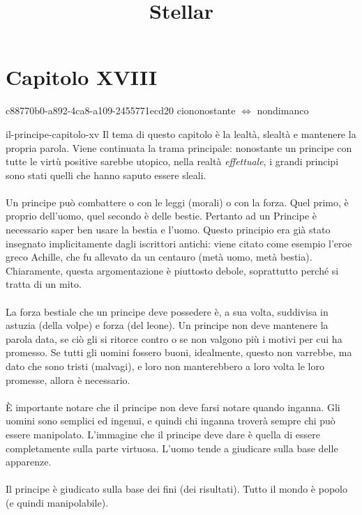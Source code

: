 \documentclass[preview]{standalone}
\begin{document}
\title{Stellar}
\genpage

\section{Capitolo XVIII}

\begin{snippetnote}{c88770b0-a892-4ca8-a109-2455771ecd20}{}
    ciononostante \(\iff\) nondimanco
\end{snippetnote}

\begin{snippet}{il-principe-capitolo-xv}
    Il tema di questo capitolo è la lealtà, slealtà e mantenere
    la propria parola.
    Viene continuata la trama principale:
    nonostante un principe con tutte le virtù positive
    sarebbe utopico, nella realtà \textit{effettuale},
    i grandi principi sono stati quelli che hanno saputo essere sleali.
    \\\\
    Un principe può combattere o con le leggi (morali)
    o con la forza. Quel primo, è proprio dell'uomo, quel secondo
    è delle bestie.
    Pertanto ad un Principe è necessario saper ben usare la bestia e l'uomo.
    Questo principio era già stato insegnato implicitamente dagli iscrittori antichi:
    viene citato come esempio l'eroe greco Achille, che fu allevato
    da un centauro (metà uomo, metà bestia).
    Chiaramente, questa argomentazione è piuttosto debole,
    soprattutto perché si tratta di un mito.
    \\\\
    La forza bestiale che un principe deve possedere è, a sua volta,
    suddivisa in astuzia (della volpe) e forza (del leone).
    Un principe non deve mantenere la parola data, se ciò
    gli si ritorce contro o se non valgono più i motivi per cui ha promesso.
    Se tutti gli uomini fossero buoni, idealmente, questo non varrebbe,
    ma dato che sono tristi (malvagi), e loro non manterebbero
    a loro volta le loro promesse, allora è necessario.
    \\\\
    È importante notare che il principe non deve farsi notare
    quando inganna. Gli uomini sono semplici ed ingenui, e quindi
    chi inganna troverà sempre chi può essere manipolato.
    L'immagine che il principe deve dare
    è quella di essere completamente sulla parte virtuosa.
    L'uomo tende a giudicare sulla base delle apparenze.
    \\\\
    Il principe è giudicato sulla base dei fini (dei risultati).
    Tutto il mondo è popolo (e quindi manipolabile).
\end{snippet}
\end{document}
